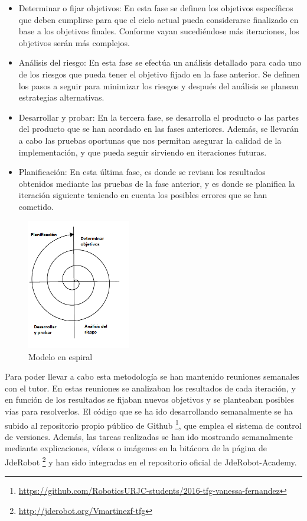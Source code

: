 \begin{itemize}
\item Determinar o fijar objetivos: En esta fase se definen los objetivos específicos que deben cumplirse para que el ciclo actual pueda considerarse finalizado en base a los objetivos finales. Conforme vayan sucediéndose más iteraciones, los objetivos serán más complejos.
\item Análisis del riesgo: En esta fase se efectúa un análisis detallado para cada uno de los riesgos que pueda tener el objetivo fijado en la fase anterior. Se definen los pasos a seguir para minimizar los riesgos y después del análisis se planean estrategias alternativas.
\item Desarrollar y probar: En la tercera fase, se desarrolla el producto o las partes del producto que se han acordado en las fases anteriores. Además, se llevarán a cabo las pruebas oportunas que nos permitan asegurar la calidad de la implementación, y que pueda seguir sirviendo en iteraciones futuras.
\item Planificación: En esta última fase, es donde se revisan los resultados obtenidos mediante las pruebas de la fase anterior, y es donde se planifica la iteración siguiente teniendo en cuenta los posibles errores que se han cometido.
\end{itemize}

\begin{figure}[H]
  \begin{center}
    \includegraphics[width=0.4\textwidth]{figures/Objetivos/espiral.png}
		\caption{Modelo en espiral}
		\label{fig.espiral}
		\end{center}
\end{figure}

Para poder llevar a cabo esta metodología se han mantenido reuniones semanales con el tutor. En estas reuniones se analizaban los resultados de cada iteración, y en función de los resultados se fijaban nuevos objetivos y se planteaban posibles vías para resolverlos. El código que se ha ido desarrollando semanalmente se ha subido al repositorio propio público de Github \footnote{\url{https://github.com/RoboticsURJC-students/2016-tfg-vanessa-fernandez}}, que emplea el sistema de control de versiones. Además, las tareas realizadas se han ido mostrando semanalmente mediante explicaciones, vídeos o imágenes en la bitácora de la página de JdeRobot \footnote{\url{http://jderobot.org/Vmartinezf-tfg}} y  han sido integradas en el repositorio oficial de JdeRobot-Academy.

